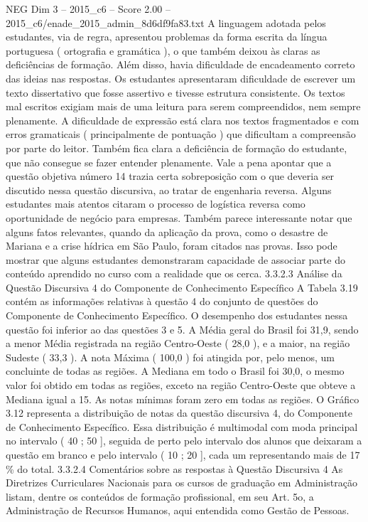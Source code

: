 \begin{textsample}{NEG Dim 3 – 2015\_c6 – Score 2.00 – 2015\_c6/enade\_2015\_admin\_8d6df9fa83.txt}
A linguagem adotada pelos estudantes, via de regra, apresentou problemas da forma escrita da língua portuguesa ( ortografia e gramática ), o que também deixou às claras as deficiências de formação.
Além disso, havia dificuldade de encadeamento correto das ideias nas respostas.
Os estudantes apresentaram dificuldade de escrever um texto dissertativo que fosse assertivo e tivesse estrutura consistente.
Os textos mal escritos exigiam mais de uma leitura para serem compreendidos, nem sempre plenamente.
A dificuldade de expressão está clara nos textos fragmentados e com erros gramaticais ( principalmente de pontuação ) que dificultam a compreensão por parte do leitor.
Também fica clara a deficiência de formação do estudante, que não consegue se fazer entender plenamente.
Vale a pena apontar que a questão objetiva número 14 trazia certa sobreposição com o que deveria ser discutido nessa questão discursiva, ao tratar de engenharia reversa.
Alguns estudantes mais atentos citaram o processo de logística reversa como oportunidade de negócio para empresas.
Também parece interessante notar que alguns fatos relevantes, quando da aplicação da prova, como o desastre de Mariana e a crise hídrica em São Paulo, foram citados nas provas.
Isso pode mostrar que alguns estudantes demonstraram capacidade de associar parte do conteúdo aprendido no curso com a realidade que os cerca. 3.3.2.3 Análise da Questão Discursiva 4 do Componente de Conhecimento Específico A Tabela 3.19 contém as informações relativas à questão 4 do conjunto de questões do Componente de Conhecimento Específico.
O desempenho dos estudantes nessa questão foi inferior ao das questões 3 e 5.
A Média geral do Brasil foi 31,9, sendo a menor Média registrada na região Centro-Oeste ( 28,0 ), e a maior, na região Sudeste ( 33,3 ).
A nota Máxima ( 100,0 ) foi atingida por, pelo menos, um concluinte de todas as regiões.
A Mediana em todo o Brasil foi 30,0, o mesmo valor foi obtido em todas as regiões, exceto na região Centro-Oeste que obteve a Mediana igual a 15.
As notas mínimas foram zero em todas as regiões.
O Gráfico 3.12 representa a distribuição de notas da questão discursiva 4, do Componente de Conhecimento Específico.
Essa distribuição é multimodal com moda principal no intervalo ( 40 ; 50 ], seguida de perto pelo intervalo dos alunos que deixaram a questão em branco e pelo intervalo ( 10 ; 20 ], cada um representando mais de 17 \% do total. 3.3.2.4 Comentários sobre as respostas à Questão Discursiva 4 As Diretrizes Curriculares Nacionais para os cursos de graduação em Administração listam, dentre os conteúdos de formação profissional, em seu Art. 5o, a Administração de Recursos Humanos, aqui entendida como Gestão de Pessoas.

\end{textsample}
